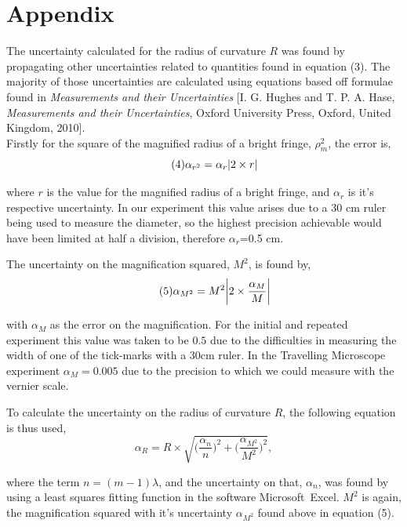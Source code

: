 \documentclass[twocolumn]{revtex4}
\begin{document}
\vfill
\twocolumngrid
\vspace{-3ex}
\section*{Appendix}
\vspace{-2ex}

The uncertainty calculated for the radius of curvature $R$ was found by propagating other uncertainties related to quantities found in equation (3). The majority of those uncertainties are calculated using equations based off formulae found in \textit{Measurements and their Uncertainties} [I. G. Hughes and T. P. A. Hase, \textit{Measurements and their Uncertainties}, Oxford University Press, Oxford, United Kingdom, 2010]. 
\\

Firstly for the square of the magnified radius of a bright fringe, $\rho_m^2$, the error is, 
\begin{equation} \tag{4}
\alpha_{r^2}=\alpha_r\abs{2\times r}
\end{equation}

where $r$ is the value for the magnified radius of a bright fringe, and $\alpha_r$ is it's respective uncertainty. In our experiment this value arises due to a 30 cm ruler being used to measure the diameter, so the highest precision achievable would have been limited at half a division, therefore $\alpha_r$=0.5 cm. 

The uncertainty on the magnification squared, $M^2$, is found by,
\begin{equation} \tag{5}
\alpha_{M^2}=M^2\abs{2\times\frac{\alpha_M}{M}}
\end{equation}

with $\alpha_{M}$ as the error on the magnification. For the initial and repeated experiment this value was taken to be $0.5$ due to the difficulties in measuring the width of one of the tick-marks with a $30$cm ruler. In the Travelling Microscope experiment $\alpha_{M}=0.005$ due to the precision to which we could measure with the vernier scale.    

To calculate the uncertainty on the radius of curvature $R$, the following equation is thus used,
\begin{equation} \tag{6}
\alpha_R=R\times\sqrt{\Big(\frac{\alpha_n}{n}\Big)^2 + \Big(\frac{\alpha_{M^2}}{M^2}\Big)^2 },
\end{equation}

where the term $n=(m-1)\lambda$, and the uncertainty on that, $\alpha_n$, was found by using a least squares fitting function in the software Microsoft\textregistered \ Excel. $M^2$ is again, the magnification squared with it's uncertainty $\alpha_{M^2}$ found above in equation (5).  
\end{document}
